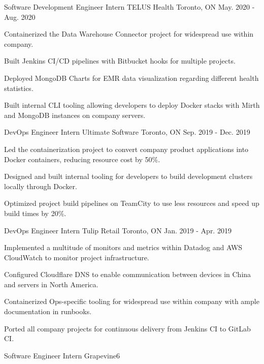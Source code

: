 \begin{cventries}
  \cventry
    {Software Development Engineer Intern}
    {TELUS Health}
    {Toronto, ON}
    {May. 2020 - Aug. 2020}
    {
      \begin{cvitems}
        \item {Containerized the Data Warehouse Connector project for widespread use within company.}
        \item {Built Jenkins CI/CD pipelines with Bitbucket hooks for multiple projects.}
        \item {Deployed MongoDB Charts for EMR data visualization regarding different health statistics.}
        \item {Built internal CLI tooling allowing developers to deploy Docker stacks with Mirth and MongoDB instances on company servers.}
      \end{cvitems}
    }
  \cventry
    {DevOps Engineer Intern}
    {Ultimate Software}
    {Toronto, ON}
    {Sep. 2019 - Dec. 2019}
    {
      \begin{cvitems}
        \item {Led the containerization project to convert company product applications into Docker containers, reducing resource cost by 50\%.}
        \item {Designed and built internal tooling for developers to build development clusters locally through Docker.}
        \item {Optimized project build pipelines on TeamCity to use less resources and speed up build times by 20\%.}
      \end{cvitems}
    }
  \cventry
    {DevOps Engineer Intern}
    {Tulip Retail}
    {Toronto, ON}
    {Jan. 2019 - Apr. 2019}
    {
      \begin{cvitems}
        \item {Implemented a multitude of monitors and metrics within Datadog and AWS CloudWatch to monitor project infrastructure.}
        \item {Configured Cloudflare DNS to enable communication between devices in China and servers in North America.}
        \item {Containerized Ops-specific tooling for widespread use within company with ample documentation in runbooks.}
        \item {Ported all company projects for continuous delivery from Jenkins CI to GitLab CI.}
      \end{cvitems}
    }
  \cventry
    {Software Engineer Intern}
    {Grapevine6}

\end{cventries}
